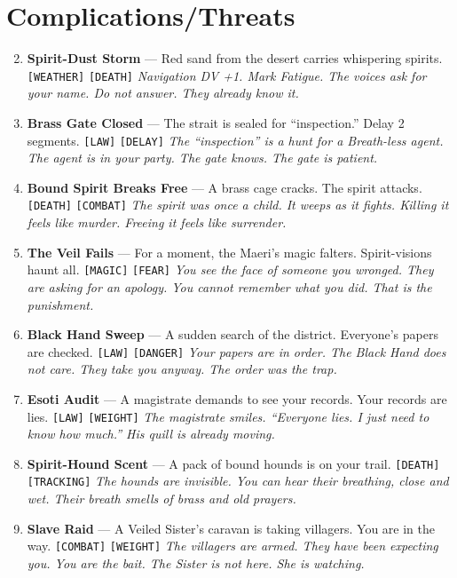 \section*{ Complications/Threats}
\label{sec:ashaan-complications}
\begin{enumerate}
\setcounter{enumi}{1}
\item \textbf{Spirit-Dust Storm} --- Red sand from the desert carries whispering spirits. \texttt{[WEATHER]} \texttt{[DEATH]}
  \hfill \textit{Navigation DV +1. Mark Fatigue. The voices ask for your name. Do not answer. They already know it.}
\item \textbf{Brass Gate Closed} --- The strait is sealed for ``inspection.'' Delay 2 segments. \texttt{[LAW]} \texttt{[DELAY]}
  \hfill \textit{The ``inspection'' is a hunt for a Breath-less agent. The agent is in your party. The gate knows. The gate is patient.}
\item \textbf{Bound Spirit Breaks Free} --- A brass cage cracks. The spirit attacks. \texttt{[DEATH]} \texttt{[COMBAT]}
  \hfill \textit{The spirit was once a child. It weeps as it fights. Killing it feels like murder. Freeing it feels like surrender.}
\item \textbf{The Veil Fails} --- For a moment, the Maeri's magic falters. Spirit-visions haunt all. \texttt{[MAGIC]} \texttt{[FEAR]}
  \hfill \textit{You see the face of someone you wronged. They are asking for an apology. You cannot remember what you did. That is the punishment.}
\item \textbf{Black Hand Sweep} --- A sudden search of the district. Everyone's papers are checked. \texttt{[LAW]} \texttt{[DANGER]}
  \hfill \textit{Your papers are in order. The Black Hand does not care. They take you anyway. The order was the trap.}
\item \textbf{Esoti Audit} --- A magistrate demands to see your records. Your records are lies. \texttt{[LAW]} \texttt{[WEIGHT]}
  \hfill \textit{The magistrate smiles. ``Everyone lies. I just need to know how much.'' His quill is already moving.}
\item \textbf{Spirit-Hound Scent} --- A pack of bound hounds is on your trail. \texttt{[DEATH]} \texttt{[TRACKING]}
  \hfill \textit{The hounds are invisible. You can hear their breathing, close and wet. Their breath smells of brass and old prayers.}
\item \textbf{Slave Raid} --- A Veiled Sister's caravan is taking villagers. You are in the way. \texttt{[COMBAT]} \texttt{[WEIGHT]}
  \hfill \textit{The villagers are armed. They have been expecting you. You are the bait. The Sister is not here. She is watching.}

\end{enumerate}
